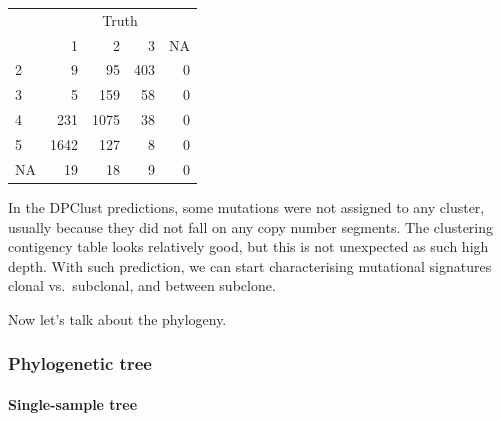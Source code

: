 \documentclass[]{article}
\newenvironment{Shaded}{\begin{snugshade}}{\end{snugshade}}
\newcommand{\DataTypeTok}[1]{\textcolor[rgb]{0.13,0.29,0.53}{#1}}
\newcommand{\DecValTok}[1]{\textcolor[rgb]{0.00,0.00,0.81}{#1}}
\newcommand{\KeywordTok}[1]{\textcolor[rgb]{0.13,0.29,0.53}{\textbf{#1}}}
\newcommand{\NormalTok}[1]{#1}
\newcommand{\OperatorTok}[1]{\textcolor[rgb]{0.81,0.36,0.00}{\textbf{#1}}}
\newcommand{\StringTok}[1]{\textcolor[rgb]{0.31,0.60,0.02}{#1}}
\let\oldparagraph\paragraph
\renewcommand{\paragraph}[1]{\oldparagraph{#1}\mbox{}}
\begin{document}
\begin{Shaded}
\end{Shaded}

\begin{table}[H]
\centering
\begin{tabular}{lrrrr}
\toprule
\multicolumn{1}{c}{} & \multicolumn{4}{c}{Truth} \\
\cmidrule(l{3pt}r{3pt}){2-5}
  & 1 & 2 & 3 & NA\\
\midrule
2 & 9 & 95 & 403 & 0\\
3 & 5 & 159 & 58 & 0\\
4 & 231 & 1075 & 38 & 0\\
5 & 1642 & 127 & 8 & 0\\
NA & 19 & 18 & 9 & 0\\
\bottomrule
\end{tabular}
\end{table}

In the DPClust predictions, some mutations were not assigned to any
cluster, usually because they did not fall on any copy number segments.
The clustering contigency table looks relatively good, but this is not
unexpected as such high depth. With such prediction, we can start
characterising mutational signatures clonal vs.~subclonal, and between
subclone.

Now let's talk about the phylogeny.

\newpage

\hypertarget{phylogenetic-tree}{%
\subsubsection{Phylogenetic tree}\label{phylogenetic-tree}}

\hypertarget{single-sample-tree}{%
\paragraph{Single-sample tree}\label{single-sample-tree}}
\end{document}

